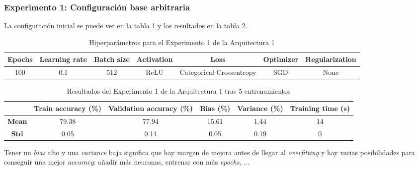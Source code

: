 \documentclass{article}
\begin{document}
		\subsubsection{Experimento 1: Configuraci\'on base arbitraria}
		\label{d-s-a1-e1}
			La configuraci\'on inicial se puede ver en la tabla \ref{tab:hip-d-a1-e1} y los resultados en la tabla \ref{tab:res-d-a1-e1}.
			\begin{table}[!h]
				\begin{center}
					\begin{tabular}{| c | c | c | c | c | c | c |}
						\textbf{Epochs} & \textbf{Learning rate} & \textbf{Batch size} & \textbf{Activation} & \textbf{Loss} & \textbf{Optimizer} & \textbf{Regularization} \\ \hline
						100 & 0.1 & 512 & ReLU & Categorical Crossentropy & SGD & None
					\end{tabular}
					\caption{Hiperpar\'ametros para el Experimento 1 de la Arquitectura 1}
					\label{tab:hip-d-a1-e1}
				\end{center}
			\end{table}
			
			\begin{table}[!h]
				\begin{center}
					\begin{tabular}{ c | c | c | c | c | c |}
						\ & \textbf{Train accuracy (\%)} & \textbf{Validation accuracy (\%)} & \textbf{Bias (\%)} & \textbf{Variance (\%)} & \textbf{Training time (s)} \\ \hline
						\textbf{Mean} & 79.38 & 77.94 & 15.61 & 1.44 & 14\\ \hline
						\textbf{Std} & 0.05 & 0.14 & 0.05 & 0.19 & 0 \\ \hline
					\end{tabular}
					\caption{Resultados del Experimento 1 de la Arquitectura 1 tras 5 entrenamientos}
					\label{tab:res-d-a1-e1}
				\end{center}
			\end{table}
			\newpage
			Tener un \textit{bias} alto y una \textit{variance} baja significa que hay margen de mejora antes de llegar al \textit{overfitting} y hay varias posibilidades para conseguir una mejor \textit{accuracy}: a\~nadir m\'as neuronas, entrenar con m\'as \textit{epochs}, ...
		
\end{document}
